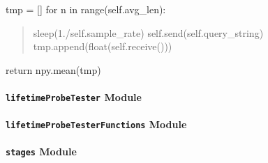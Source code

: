 \documentclass[letterpaper,10pt,english]{sphinxmanual}
\begin{document}
\begin{fulllineitems}

\begin{fulllineitems}
\label{api/mwavepy.virtualInstruments:mwavepy.virtualInstruments.generalSocketReader.GeneralSocketReader.data}
tmp = {[}{]}
for n in range(self.avg\_len):
\begin{quote}

sleep(1./self.sample\_rate)
self.send(self.query\_string)
tmp.append(float(self.receive()))
\end{quote}

return npy.mean(tmp)

\end{fulllineitems}


\begin{fulllineitems}
\label{api/mwavepy.virtualInstruments:mwavepy.virtualInstruments.generalSocketReader.GeneralSocketReader.receive}
\end{fulllineitems}


\begin{fulllineitems}
\label{api/mwavepy.virtualInstruments:mwavepy.virtualInstruments.generalSocketReader.GeneralSocketReader.send}
\end{fulllineitems}


\end{fulllineitems}



\paragraph{\texttt{lifetimeProbeTester} Module}
\label{api/mwavepy.virtualInstruments:lifetimeprobetester-module}

\paragraph{\texttt{lifetimeProbeTesterFunctions} Module}
\label{api/mwavepy.virtualInstruments:lifetimeprobetesterfunctions-module}

\paragraph{\texttt{stages} Module}
\label{api/mwavepy.virtualInstruments:stages-module}
\end{document}
